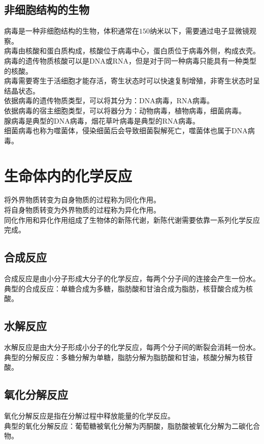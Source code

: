 \documentclass[UTF8]{ctexart}
\begin{document}
\subsection{非细胞结构的生物}
    病毒是一种非细胞结构的生物，体积通常在$150$纳米以下，需要通过电子显微镜观察。\\[3mm]
    病毒由核酸和蛋白质构成，核酸位于病毒中心，蛋白质位于病毒外侧，构成衣壳。\\[3mm]
    病毒的遗传物质核酸可以是DNA或RNA，但是对于同一种病毒只能具有一种类型的核酸。\\[3mm]
    病毒需要寄生于活细胞才能存活，寄生状态时可以快速复制增殖，非寄生状态时呈结晶状态。\\[6mm]
    依据病毒的遗传物质类型，可以将其分为：DNA病毒，RNA病毒。\\[3mm]
    依据病毒的宿主细胞类型，可以将器分为：动物病毒，植物病毒，细菌病毒。\\[3mm]
    腺病毒是典型的DNA病毒，烟花草叶病毒是典型的RNA病毒。\\[3mm]
    细菌病毒也称为噬菌体，侵染细菌后会导致细菌裂解死亡，噬菌体也属于DNA病毒。

\newpage

\section{生命体内的化学反应}
    将外界物质转变为自身物质的过程称为同化作用。\\[3mm]
    将自身物质转变为外界物质的过程称为异化作用。\\[3mm]
    同化作用和异化作用组成了生物体的新陈代谢，新陈代谢需要依靠一系列化学反应完成。

\subsection{合成反应}
    合成反应是由小分子形成大分子的化学反应，每两个分子间的连接会产生一份水。\\[3mm]
    典型的合成反应：单糖合成为多糖，脂肪酸和甘油合成为脂肪，核苷酸合成为核酸。

\subsection{水解反应}
    水解反应是由大分子形成小分子的化学反应，每两个分子间的断裂会消耗一份水。\\[3mm]
    典型的分解反应：多糖分解为单糖，脂肪分解为脂肪酸和甘油，核酸分解为核苷酸。

\subsection{氧化分解反应}
    氧化分解反应是指在分解过程中释放能量的化学反应。\\[3mm]
    典型的氧化分解反应：葡萄糖被氧化分解为丙酮酸，脂肪酸被氧化分解为二碳化合物。
\end{document}
